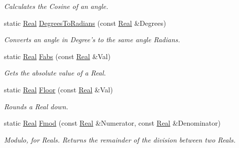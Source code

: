 \begin{DoxyCompactItemize}
\begin{DoxyCompactList}\small\item\em Calculates the Cosine of an angle. \item\end{DoxyCompactList}\item 
static \hyperlink{namespaceMezzanine_a726731b1a7df72bf3583e4a97282c6f6}{Real} \hyperlink{classMezzanine_1_1MathTool_a211eb278e9b51404cc10e7b12dfe5209}{DegreesToRadians} (const \hyperlink{namespaceMezzanine_a726731b1a7df72bf3583e4a97282c6f6}{Real} \&Degrees)
\begin{DoxyCompactList}\small\item\em Converts an angle in Degree's to the same angle Radians. \item\end{DoxyCompactList}\item 
static \hyperlink{namespaceMezzanine_a726731b1a7df72bf3583e4a97282c6f6}{Real} \hyperlink{classMezzanine_1_1MathTool_a96b1935e6ed6d9d2ffa03fd2e7698c3e}{Fabs} (const \hyperlink{namespaceMezzanine_a726731b1a7df72bf3583e4a97282c6f6}{Real} \&Val)
\begin{DoxyCompactList}\small\item\em Gets the absolute value of a Real. \item\end{DoxyCompactList}\item 
static \hyperlink{namespaceMezzanine_a726731b1a7df72bf3583e4a97282c6f6}{Real} \hyperlink{classMezzanine_1_1MathTool_a51eae53cadb52839ae6edb279627fabd}{Floor} (const \hyperlink{namespaceMezzanine_a726731b1a7df72bf3583e4a97282c6f6}{Real} \&Val)
\begin{DoxyCompactList}\small\item\em Rounds a Real down. \item\end{DoxyCompactList}\item 
static \hyperlink{namespaceMezzanine_a726731b1a7df72bf3583e4a97282c6f6}{Real} \hyperlink{classMezzanine_1_1MathTool_a4e4171768a241441a1ed0b33c68bdc9c}{Fmod} (const \hyperlink{namespaceMezzanine_a726731b1a7df72bf3583e4a97282c6f6}{Real} \&Numerator, const \hyperlink{namespaceMezzanine_a726731b1a7df72bf3583e4a97282c6f6}{Real} \&Denominator)
\begin{DoxyCompactList}\small\item\em Modulo, for Reals. Returns the remainder of the division between two Reals. \item\end{DoxyCompactList}\item 

\end{DoxyCompactItemize}
